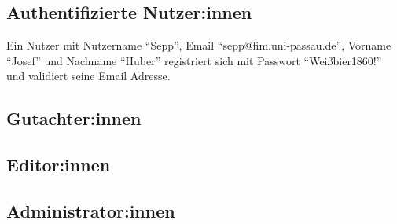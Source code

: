 \subsection{Authentifizierte Nutzer:innen}
\begin{description}
	
	 Ein Nutzer mit Nutzername ``Sepp'', Email ``sepp@fim.uni-passau.de'', Vorname ``Josef'' und Nachname ``Huber''  registriert sich mit Passwort ``Weißbier1860!'' und validiert seine Email Adresse.
	
\end{description}
\subsection{Gutachter:innen}
\subsection{Editor:innen}
\subsection{Administrator:innen}